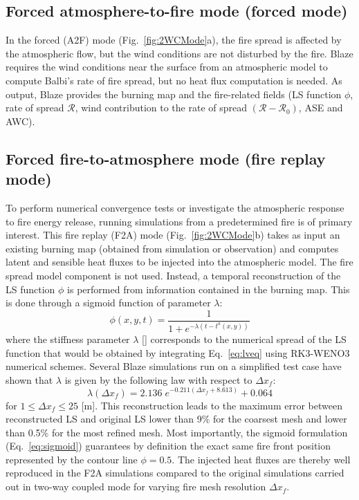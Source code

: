 \subsection{Forced atmosphere-to-fire mode (forced mode)}
\label{ssec:cpl1A2F}

In the forced (A2F) mode (Fig.~\ref{fig:2WCMode}a), the fire spread is affected by the atmospheric flow, but the wind conditions are not disturbed by the fire. Blaze requires the wind conditions near the surface from an atmospheric model to compute Balbi's rate of fire spread, but no heat flux computation is needed. As output, Blaze provides the burning map and the fire-related fields (LS function $\phi$, rate of spread $\mathcal R$, wind contribution to the rate of spread $(\mathcal R - \mathcal R_0)$, ASE and AWC).

\subsection{Forced fire-to-atmosphere mode (fire replay mode)}
\label{ssec:cpl1F2A}

To perform numerical convergence tests or investigate the atmospheric response to fire energy release, running simulations from a predetermined fire is of primary interest. This fire replay (F2A) mode (Fig.~\ref{fig:2WCMode}b) takes as input an existing burning map (obtained from simulation or observation) and computes latent and sensible heat fluxes to be injected into the atmospheric model. The fire spread model component is not used. Instead, a temporal reconstruction of the LS function $\phi$ is performed from information contained in the burning map. This is done through a sigmoid function of parameter $\lambda$:
\begin{equation}
  \phi (x,y,t) = \frac{1}{1+ e^{-\lambda (t - t^a (x,y)) }}
  \label{eq:sigmoid}
\end{equation}
where the stiffness parameter $\lambda$ [\reciprocal \second] corresponds to the numerical spread of the LS function that would be obtained by integrating Eq.~\eqref{eq:lveq} using RK3-WENO3 numerical schemes. 
Several Blaze simulations run on a simplified test case have shown that $\lambda$ is given by the following law with respect to $\Delta x_f$:
\begin{equation}
 \lambda (\Delta x_f ) = 2.136 \; e^{-0.211 (\Delta x_f + 8.613)} + 0.064
\end{equation}
for $1 \leqslant \Delta x_f \leqslant 25 $ [m]. This reconstruction leads to the maximum error between reconstructed LS and original LS lower than 9\% for the coarsest mesh and lower than 0.5\% for the most refined mesh. Most importantly, the sigmoid formulation (Eq.~\ref{eq:sigmoid}) guarantees by definition the exact same fire front position represented by the contour line $\phi=0.5$. The injected heat fluxes are thereby well reproduced in the F2A simulations compared to the original simulations carried out in two-way coupled mode for varying fire mesh resolution $\Delta x_f$.

